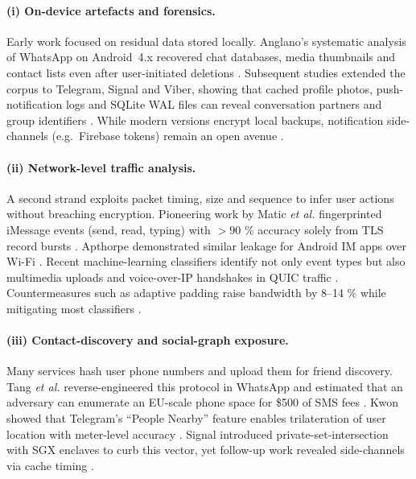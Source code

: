 \documentclass[a4paper,12pt]{report}
\begin{document}
\paragraph{(i) On-device artefacts and forensics.}
Early work focused on residual data stored locally.
Anglano’s systematic analysis of WhatsApp on Android~4.x recovered chat
databases, media thumbnails and contact lists even after user‐initiated
deletions \cite{anglano2015whatsapp}.
Subsequent studies extended the corpus to Telegram, Signal and Viber,
showing that cached profile photos, push-notification logs and SQLite WAL
files can reveal conversation partners and group identifiers
\cite{moltchanov2018telegram, obermeier2018signal}.
While modern versions encrypt local backups, notification side-channels
(e.g.\ Firebase tokens) remain an open avenue \cite{berezowski2020push}.

\paragraph{(ii) Network-level traffic analysis.}
A second strand exploits packet timing, size and sequence to infer user
actions without breaching encryption.
Pioneering work by Matic \emph{et al.} fingerprinted iMessage events
(send, read, typing) with $>90$ \% accuracy solely from TLS record
bursts \cite{matic2015iMessage}.
Apthorpe demonstrated similar leakage for Android IM apps over Wi-Fi
\cite{apthorpe2018smart}.
Recent machine-learning classifiers identify not only event types but also
multimedia uploads and voice-over-IP handshakes in QUIC traffic
\cite{lee2023quic}.
Countermeasures such as adaptive padding raise bandwidth by 8–14 \%
while mitigating most classifiers \cite{poblete2021defence}.

\paragraph{(iii) Contact-discovery and social-graph exposure.}
Many services hash user phone numbers and upload them for friend
discovery.  Tang \emph{et al.} reverse-engineered this protocol in
WhatsApp and estimated that an adversary can enumerate an EU-scale phone
space for \$500 of SMS fees \cite{tang2020whatsappHash}.
Kwon showed that Telegram’s “People Nearby” feature enables trilateration
of user location with meter-level accuracy \cite{kwon2021telegram}.  Signal
introduced private-set‐intersection with SGX enclaves to curb this vector,
yet follow-up work revealed side-channels via cache timing
\cite{marforio2022psi}.
\end{document}
